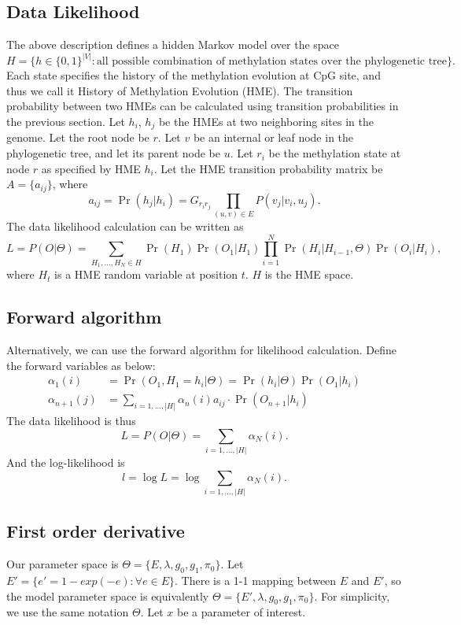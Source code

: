 \documentclass[11pt]{article}
\begin{document}
\subsection{Data Likelihood}
The above description defines a hidden Markov model over the
space $$H=\{h\in\{0,1\}^{|V|}: \text{all possible combination of
methylation states over the phylogenetic tree} \}.$$ Each state
specifies the history of the methylation evolution at CpG site, and
thus we call it History of Methylation Evolution (HME). The transition
probability between two HMEs can be calculated using transition
probabilities in the previous section. Let $h_i$, $h_j$ be the HMEs at
two neighboring sites in the genome. Let the root node be $r$. Let $v$
be an internal or leaf node in the phylogenetic tree, and let its
parent node be $u$. Let $r_i$ be the methylation state at node $r$ as
specified by HME $h_i$. Let the HME transition probability matrix be
$A=\{a_{ij}\}$, where
$$a_{ij}=\Pr(h_j|h_i) = G_{r_ir_j}\prod_{(u,v)\in E}P(v_j|v_i,u_j).$$
The data likelihood calculation can be written as
\begin{equation}
L = P(O|\Theta) =\sum_{H_1,\ldots, H_N\in H} \Pr(H_1)\Pr(O_1|H_1)\prod_{i=1}^{N} \Pr(H_i| H_{i-1}, \Theta)\Pr(O_i|H_i),
\end{equation}
where $H_t$ is a HME random variable at position $t$. $H$ is the HME
space.

\subsection*{Forward algorithm}
Alternatively, we can use the forward algorithm for likelihood
calculation. Define the forward variables as below:
\begin{equation}
\begin{aligned}
\alpha_1(i) &= \Pr(O_1, H_1=h_i|\Theta) = \Pr(h_i|\Theta)\Pr(O_1|h_i)\\
\alpha_{n+1}(j) & = \sum_{i=1,\ldots, |H|} \alpha_n(i)a_{ij} \cdot \Pr(O_{n+1}|h_i)
\end{aligned}
\end{equation}
The data likelihood is thus
$$L = P(O|\Theta) = \sum_{i=1,\ldots, |H|}\alpha_{N}(i).$$
And the log-likelihood is
$$l = \log{L} = \log\sum_{i=1,\ldots, |H|}\alpha_{N}(i).$$

\subsection{First order derivative}
Our parameter space is $\Theta=\{E,\lambda, g_0, g_1, \pi_0\}$.
Let $E'= \{e'= 1-exp(-e):\forall e\in E\}$. There is a 1-1 mapping
between $E$ and $E'$, so the model parameter space is equivalently
$\Theta=\{E',\lambda, g_0, g_1, \pi_0\}$. For simplicity, we use the
same notation $\Theta$. Let $x$ be a parameter of interest.
\end{document}
